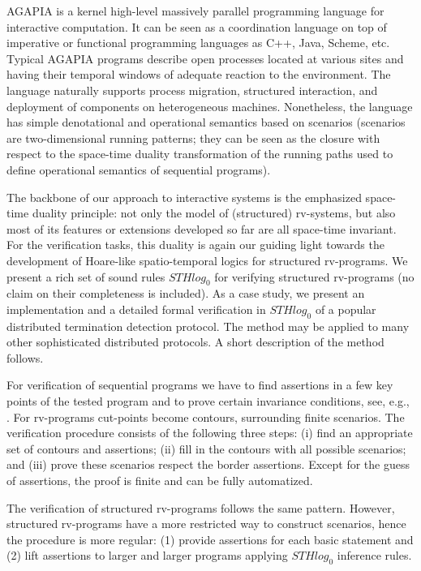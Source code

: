 \documentclass[runningheads]{llncs}
\newcommand{\1}{\u{a}}
\newcommand{\2}{\c{s}}
\newcommand{\5}{\c{t}}
\newcommand{\8}{\^{\i}}
\newcommand{\9}{\^{a}}
\begin{document}
AGAPIA \cite{dr-st07b,pss07} is a kernel high-level massively parallel programming language for interactive
computation. It can be seen as a coordination language on top of imperative or functional programming
languages as C++, Java, Scheme, etc.  Typical AGAPIA programs describe open processes located at various sites
and having their temporal windows of adequate reaction to the environment. The language naturally supports
process migration, structured interaction, and deployment of components on heterogeneous
machines. Nonetheless, the language has simple denotational and operational semantics based on scenarios
(scenarios are two-dimensional running patterns; they can be seen as the closure with respect to the
space-time duality transformation of the running paths used to define operational semantics of sequential
programs).

The backbone of our approach to interactive systems is the emphasized space-time duality principle: not only
the model of (structured) rv-systems, but also most of its features or extensions developed so far are all
space-time invariant. For the verification tasks, this duality is again our guiding light towards the
development of Hoare-like spatio-temporal logics for structured rv-programs. We present a rich set of sound
rules $STHlog_0$ for verifying structured rv-programs (no claim on their completeness is included). As a case
study, we present an implementation and a detailed formal verification in $STHlog_0$ of a popular distributed
termination detection protocol. The method may be applied to many other sophisticated distributed protocols. A
short description of the method follows.

For verification of sequential programs we have to find assertions in a few key points of the tested program
and to prove certain invariance conditions, see, e.g., \cite{lics-book}. For rv-programs cut-points become
contours, surrounding finite scenarios. The verification procedure \cite{ste06b} consists of the following
three steps: (i) find an appropriate set of contours and assertions; (ii) fill in the contours with all
possible scenarios; and (iii) prove these scenarios respect the border assertions.  Except for the guess of
assertions, the proof is finite and can be fully automatized. 

The verification of structured rv-programs follows the same pattern. However, structured rv-programs have a
more restricted way to construct scenarios, hence the procedure is more regular: (1) provide assertions for
each basic statement and (2) lift assertions to larger and larger programs applying $STHlog_0$ inference
rules.
\end{document}
